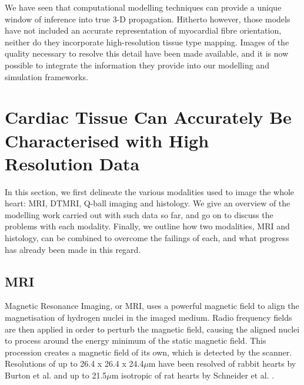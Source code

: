   We have seen that computational modelling techniques can provide a unique window of inference into true 3-D propagation. Hitherto however, those models have not included an accurate representation of myocardial fibre orientation, neither do they incorporate high-resolution tissue type mapping. Images of the quality necessary to resolve this detail have been made available, and it is now possible to integrate the information they provide into our modelling and simulation frameworks.

\section{Cardiac Tissue Can Accurately Be Characterised with High Resolution Data} %
\label{sec:cardiac_tissue_can_be_accurately_characterised_with_high_resolution_data}
  In this section, we first delineate the various modalities used to image the whole heart: MRI, DTMRI, Q-ball imaging and histology. We give an overview of the modelling work carried out with such data so far, and go on to discuss the problems with each modality. Finally, we outline how two modalities, MRI and histology, can be combined to overcome the failings of each, and what progress has already been made in this regard.
  
  \subsection{MRI} %
  \label{sub:mri}
    Magnetic Resonance Imaging, or MRI, uses a powerful magnetic field to align the magnetisation of hydrogen nuclei in the imaged medium. Radio frequency fields are then applied in order to perturb the magnetic field, causing the aligned nuclei to process around the energy minimum of the static magnetic field. This procession creates a magnetic field of its own, which is detected by the scanner. Resolutions of up to 26.4 x 26.4 x 24.4$\mu$m have been resolved of rabbit hearts by Burton et al. \cite{Burton2006} and up to 21.5$\mu$m isotropic of rat hearts by Schneider et al. \cite{Schneider2004}.
    
  
